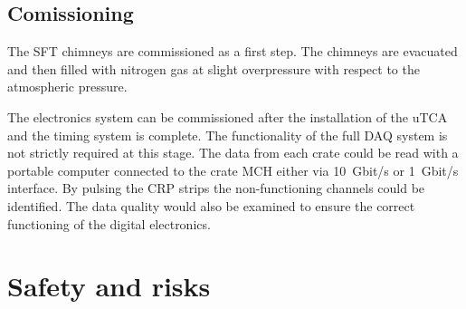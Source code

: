 
\subsection{Comissioning}
\label{sec:fddp-tpc-elec-install-calib}


The SFT chimneys are commissioned as a first step. The chimneys are evacuated and then filled with nitrogen gas at slight overpressure with respect to the atmospheric pressure.

The electronics system can be commissioned after the installation of the uTCA and the timing system is complete. The functionality of the full DAQ system is not strictly required at this stage. The data from each crate could be read with a portable computer connected to the crate MCH either via \SI{10}{Gbit/s} or \SI{1}{Gbit/s} interface. By pulsing the CRP strips the non-functioning channels could be identified. The data quality would also be examined to ensure the correct functioning of the digital electronics.   






\section{Safety and risks}
\label{sec:fddp-tpc-elec-safety}

